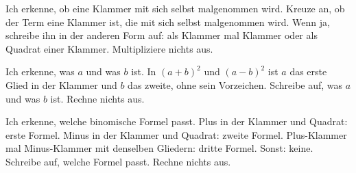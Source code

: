 \setcounter{aufgabe}{27}

\begin{aufgabe}{Ich erkenne, ob eine Klammer mit sich selbst malgenommen wird. Kreuze an, ob der Term eine Klammer ist, die mit sich selbst malgenommen wird. Wenn ja, schreibe ihn in der anderen Form auf: als Klammer mal Klammer oder als Quadrat einer Klammer. Multipliziere nichts aus.}
\begin{geruest}
\end{geruest}
\end{aufgabe}

\begin{aufgabe}{Ich erkenne, was $a$ und was $b$ ist. In $(a + b)^2$ und $(a - b)^2$ ist $a$ das erste Glied in der Klammer und $b$ das zweite, ohne sein Vorzeichen. Schreibe auf, was $a$ und was $b$ ist. Rechne nichts aus.}
\begin{geruest}
\end{geruest}
\end{aufgabe}

\begin{aufgabe}{Ich erkenne, welche binomische Formel passt. Plus in der Klammer und Quadrat: erste Formel. Minus in der Klammer und Quadrat: zweite Formel. Plus-Klammer mal Minus-Klammer mit denselben Gliedern: dritte Formel. Sonst: keine. Schreibe auf, welche Formel passt. Rechne nichts aus.}
\begin{geruest}
\end{geruest}
\end{aufgabe}


